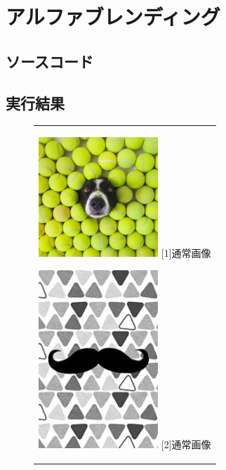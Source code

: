 \documentclass[a4paper,11pt,titlepage]{bxjsarticle}
\begin{document}
\section{アルファブレンディング}
\subsection{ソースコード}

\subsection{実行結果}
\begin{figure}[htbp]
  \begin{center}
    \begin{tabular}{c}

      \begin{minipage}{0.33\hsize}
        \begin{center}
          \includegraphics[clip, width=4.5cm]{./sample3.jpg}
          \hspace{1.6cm} [1]通常画像
        \end{center}
      \end{minipage}

      \begin{minipage}{0.33\hsize}
        \begin{center}
          \includegraphics[clip, width=4.5cm]{./sample4.jpg}
          \hspace{1.6cm} [2]通常画像
        \end{center}
      \end{minipage}


\end{tabular}
\end{center}
\end{figure}
\end{document}
